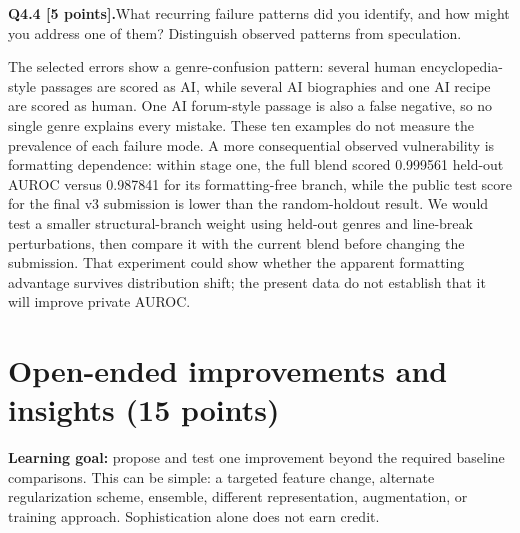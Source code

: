 \documentclass[11pt,letterpaper]{article}
\newcommand{\question}[2]{\needspace{4\baselineskip}\par\addvspace{0.45em}\noindent\textbf{#1}\quad #2\par\nobreak\vspace{0.1em}}
\begin{document}
\question{Q4.4 [5 points].}{What recurring failure patterns did you identify, and how might you address one of them? Distinguish observed patterns from speculation.}
The selected errors show a genre-confusion pattern: several human encyclopedia-style passages are scored as AI, while several AI biographies and one AI recipe are scored as human. One AI forum-style passage is also a false negative, so no single genre explains every mistake. These ten examples do not measure the prevalence of each failure mode. A more consequential observed vulnerability is formatting dependence: within stage one, the full blend scored 0.999561 held-out AUROC versus 0.987841 for its formatting-free branch, while the public test score for the final v3 submission is lower than the random-holdout result. We would test a smaller structural-branch weight using held-out genres and line-break perturbations, then compare it with the current blend before changing the submission. That experiment could show whether the apparent formatting advantage survives distribution shift; the present data do not establish that it will improve private AUROC.

\newpage
\section{Open-ended improvements and insights (15 points)}
\textbf{Learning goal:} propose and test one improvement beyond the required baseline comparisons. This can be simple: a targeted feature change, alternate regularization scheme, ensemble, different representation, augmentation, or training approach. Sophistication alone does not earn credit.
\end{document}
